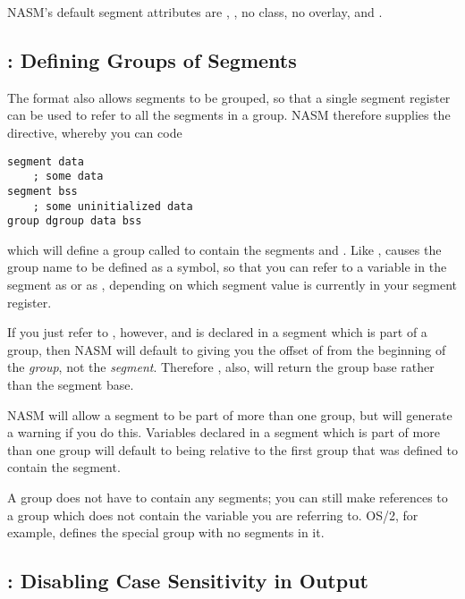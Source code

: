 NASM's default segment attributes are , , no
class, no overlay, and .

\subsection{: Defining Groups of Segments}
\label{subsec:group}

The  format also allows segments to be grouped, so that a
single segment register can be used to refer to all the segments in
a group. NASM therefore supplies the  directive, whereby
you can code

\begin{lstlisting}
segment data
    ; some data
segment bss
    ; some uninitialized data
group dgroup data bss
\end{lstlisting}

which will define a group called  to contain the segments
 and . Like ,  causes
the group name to be defined as a symbol, so that you can refer to
a variable  in the  segment as 
or as , depending on which segment value is
currently in your segment register.

If you just refer to , however, and  is declared
in a segment which is part of a group, then NASM will default to giving
you the offset of  from the beginning of the \emph{group},
not the \emph{segment}. Therefore , also, will return
the group base rather than the segment base.

NASM will allow a segment to be part of more than one group, but
will generate a warning if you do this. Variables declared in a
segment which is part of more than one group will default to being
relative to the first group that was defined to contain the segment.

A group does not have to contain any segments; you can still make
 references to a group which does not contain the variable
you are referring to. OS/2, for example, defines the special group
 with no segments in it.

\subsection{: Disabling Case Sensitivity in Output}
\label{subsec:uppercase}

